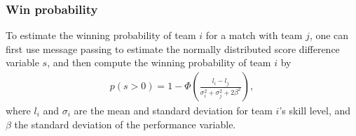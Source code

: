 \subsubsection{Win probability} 
To estimate the winning probability of team $i$ for a match with team $j$, one can first use message passing to estimate the normally distributed score difference variable $s$, and then compute the winning probability of team $i$ by
\begin{align}
  p(s>0) = 1 -
  \Phi\left(\frac{l_i-l_j}{\sigma_i^2+\sigma_j^2+2 \beta^2}\right),
\end{align}
where $l_i$ and $\sigma_i$ are the mean and standard deviation for
team $i$'s skill level, and $\beta$ the standard deviation of the
performance variable.

